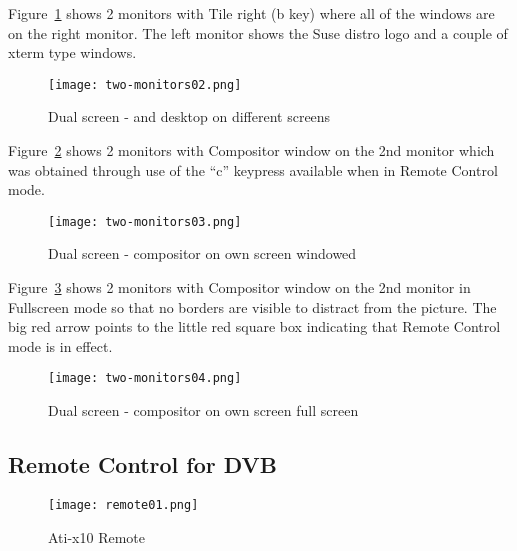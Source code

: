 Figure~\ref{fig:two-monitors02} shows 2 monitors with Tile right (b key) where all of the \CGG{} windows are on the right monitor.  The left monitor shows the Suse distro logo and a couple of xterm type windows.

\begin{figure}[htpb]
    \centering
    \texttt{[image: two-monitors02.png]}
    \caption{Dual screen - \CGG{} and desktop on different screens}
    \label{fig:two-monitors02}
\end{figure}

Figure~\ref{fig:two-monitors03} shows 2 monitors with Compositor window on the 2nd monitor which was obtained through use of the “c” keypress available when in Remote Control mode.

\begin{figure}[htpb]
    \centering
    \texttt{[image: two-monitors03.png]}
    \caption{Dual screen - \CGG{} compositor on own screen windowed}
    \label{fig:two-monitors03}
\end{figure}

Figure~\ref{fig:two-monitors04} shows 2 monitors with Compositor window on the 2nd monitor in Fullscreen mode so that no \CGG{} borders are visible to distract from the picture.  The big red arrow points to the little red square box indicating that Remote Control mode is in effect.

\begin{figure}[htpb]
    \centering
    \texttt{[image: two-monitors04.png]}
    \caption{Dual screen - \CGG{} compositor on own screen full screen}
    \label{fig:two-monitors04}
\end{figure}

\subsection{Remote Control for DVB}%
\label{sub:remote_control_dvb}

\begin{wrapfigure}[18]{O}{0.3\linewidth} 
    \centering
    \texttt{[image: remote01.png]}
    \caption{Ati-x10 Remote}
    \label{fig:remote01}
\end{wrapfigure}

